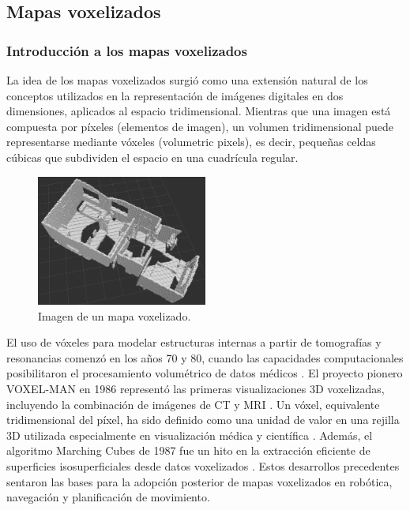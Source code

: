 \documentclass[12pt, a4paper, twoside]{article}
\begin{document}
\subsection{Mapas voxelizados}

\subsubsection{Introducción a los mapas voxelizados}
La idea de los mapas voxelizados surgió como una extensión natural de los conceptos utilizados en la representación 
de imágenes digitales en dos dimensiones, aplicados al espacio tridimensional. Mientras que una imagen está compuesta 
por píxeles (elementos de imagen), un volumen tridimensional puede representarse mediante vóxeles (volumetric pixels), 
es decir, pequeñas celdas cúbicas que subdividen el espacio en una cuadrícula regular. \newline

\begin{figure}[h]
  \centering
    \includegraphics[width=0.5\textwidth]{Voxel_map_example.png}
  \caption{Imagen de un mapa voxelizado.}
\end{figure} 

El uso de vóxeles para modelar estructuras internas a partir de tomografías y resonancias comenzó en los años 70 y 80, 
cuando las capacidades computacionales posibilitaron el procesamiento volumétrico de datos médicos \cite{wired1996voxels_medical}. 
El proyecto pionero VOXEL-MAN en 1986 representó las primeras visualizaciones 3D voxelizadas, incluyendo la combinación de imágenes 
de CT y MRI \cite{voxelman1986history}. Un vóxel, equivalente tridimensional del píxel, ha sido definido como una unidad de valor en 
una rejilla 3D utilizada especialmente en visualización médica y científica \cite{wiki_voxel_definition}. Además, 
el algoritmo Marching Cubes de 1987 fue un hito en la extracción eficiente de superficies isosuperficiales desde datos 
voxelizados \cite{lorensen1987marchingcubes}. Estos desarrollos precedentes sentaron las bases para la adopción posterior 
de mapas voxelizados en robótica, navegación y planificación de movimiento.
\end{document}
